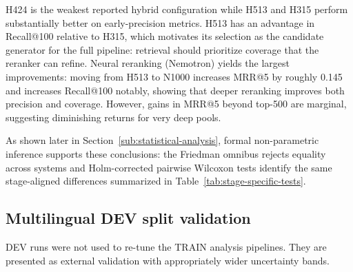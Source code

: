 H424 is the weakest reported hybrid configuration while H513 and H315 perform substantially better on early-precision metrics. H513 has an advantage in Recall@100 relative to H315, which motivates its selection as the candidate generator for the full pipeline: retrieval should prioritize coverage that the reranker can refine. Neural reranking (Nemotron) yields the largest improvements: moving from H513 to N1000 increases MRR@5 by roughly 0.145 and increases Recall@100 notably, showing that deeper reranking improves both precision and coverage. However, gains in MRR@5 beyond top-500 are marginal, suggesting diminishing returns for very deep pools.

As shown later in Section~\ref{sub:statistical-analysis}, formal non-parametric inference supports these conclusions: the Friedman omnibus rejects equality across systems and Holm-corrected pairwise Wilcoxon tests identify the same stage-aligned differences summarized in Table~\ref{tab:stage-specific-tests}.

\subsection{Multilingual DEV split validation}\label{sub:multilingual-dev}

DEV runs were not used to re-tune the TRAIN analysis pipelines. They are presented as external validation with appropriately wider uncertainty bands.

\begin{table}[htbp]
    \centering
    \footnotesize
    \caption{Fine-tuned Nemotron LoRA validation on labeled development data. The final column reports rank-bucket counts for strong successes and unresolved failures.}\label{tab:multilingual-dev}
\end{table}

